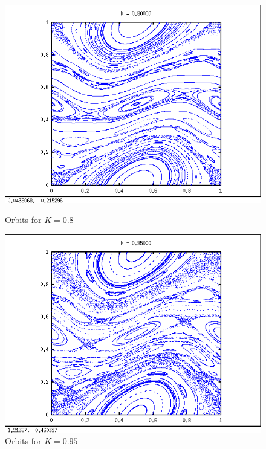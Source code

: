 \documentclass{article}
\begin{document}
\begin{figure}[H]
\centering
\begin{minipage}{0.5\textwidth}
\centering
\includegraphics[width=\textwidth]{k08.png}
\caption{Orbits for $K = 0.8$}
\end{minipage}\hfill
\begin{minipage}{0.5\textwidth}
\centering
\includegraphics[width=\textwidth]{k095.png}
\caption{Orbits for $K = 0.95$}
\end{minipage}
\end{figure}
\end{document}
